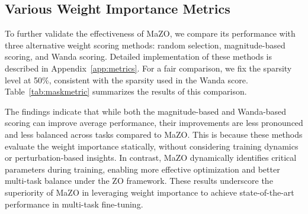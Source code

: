 \subsection{Various Weight Importance Metrics}  

\begin{table}[t]
    \centering
    \caption{Comparison of different weight importance metrics. The sparsity is set to 50\% except for \textit{No Mask}. Random and Magnitude are done weight-wise while Wanda and MaZO are selected row-wise.}
    \label{tab:maskmetric}
    \vspace{-8pt} 
\end{table}

To further validate the effectiveness of MaZO, we compare its performance with three alternative weight scoring methods: random selection, magnitude-based scoring, and Wanda scoring. Detailed implementation of these methods is described in Appendix~\ref{app:metrics}. For a fair comparison, we fix the sparsity level at 50\%, consistent with the sparsity used in the Wanda score. Table~\ref{tab:maskmetric} summarizes the results of this comparison.

The findings indicate that while both the magnitude-based and Wanda-based scoring can improve average performance, their improvements are less pronounced and less balanced across tasks compared to MaZO. This is because these methods evaluate the weight importance statically, without considering training dynamics or perturbation-based insights. In contrast, MaZO dynamically identifies critical parameters during training, enabling more effective optimization and better multi-task balance under the ZO framework. These results underscore the superiority of MaZO in leveraging weight importance to achieve state-of-the-art performance in multi-task fine-tuning.





